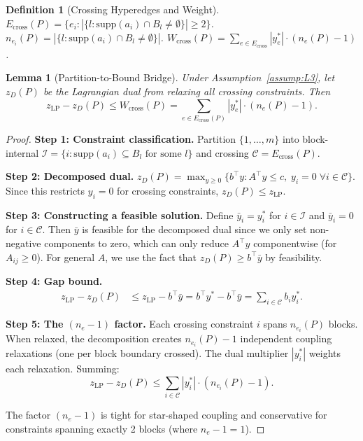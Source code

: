 \documentclass[12pt]{article}
\newtheorem{lemma}[theorem]{Lemma}
\newtheorem{definition}[theorem]{Definition}
\begin{document}
\begin{definition}[Crossing Hyperedges and Weight]
\label{def:crossing}
$E_{\mathrm{cross}}(P) = \{e_i : |\{l : \mathrm{supp}(a_i) \cap B_l \neq \emptyset\}| \geq 2\}$.
$n_{e_i}(P) = |\{l : \mathrm{supp}(a_i) \cap B_l \neq \emptyset\}|$.
$W_{\mathrm{cross}}(P) = \sum_{e \in E_{\mathrm{cross}}} |y_e^*| \cdot (n_e(P) - 1)$.
\end{definition}

\begin{lemma}[Partition-to-Bound Bridge]
\label{lem:L3}
Under Assumption~\ref{assump:L3}, let $z_D(P)$ be the Lagrangian dual
from relaxing all crossing constraints.  Then
\begin{equation}\label{eq:L3}
  z_{\mathrm{LP}} - z_D(P) \leq W_{\mathrm{cross}}(P)
  = \sum_{e \in E_{\mathrm{cross}}(P)} |y_e^*| \cdot (n_e(P) - 1).
\end{equation}
\end{lemma}

\begin{proof}
\textbf{Step 1: Constraint classification.}
Partition $\{1, \ldots, m\}$ into block-internal
$\mathcal{I} = \{i : \mathrm{supp}(a_i) \subseteq B_l \text{ for some } l\}$
and crossing $\mathcal{C} = E_{\mathrm{cross}}(P)$.

\textbf{Step 2: Decomposed dual.}
$z_D(P) = \max_{y \geq 0} \{ b^\top y : A^\top y \leq c,\; y_i = 0\;\forall i \in \mathcal{C} \}$.
Since this restricts $y_i = 0$ for crossing constraints, $z_D(P) \leq z_{\mathrm{LP}}$.

\textbf{Step 3: Constructing a feasible solution.}
Define $\bar{y}_i = y_i^*$ for $i \in \mathcal{I}$ and $\bar{y}_i = 0$ for
$i \in \mathcal{C}$.  Then $\bar{y}$ is feasible for the decomposed dual
since we only set non-negative components to zero, which can only reduce
$A^\top y$ componentwise (for $A_{ij} \geq 0$).  For general $A$, we use
the fact that $z_D(P) \geq b^\top \bar{y}$ by feasibility.

\textbf{Step 4: Gap bound.}
\begin{align}
  z_{\mathrm{LP}} - z_D(P)
  &\leq z_{\mathrm{LP}} - b^\top \bar{y}
  = b^\top y^* - b^\top \bar{y}
  = \sum_{i \in \mathcal{C}} b_i y_i^*.
\end{align}

\textbf{Step 5: The $(n_e - 1)$ factor.}
Each crossing constraint $i$ spans $n_{e_i}(P)$ blocks.  When relaxed, the
decomposition creates $n_{e_i}(P) - 1$ independent coupling relaxations
(one per block boundary crossed).  The dual multiplier $|y_i^*|$
weights each relaxation.  Summing:
\[
  z_{\mathrm{LP}} - z_D(P) \leq \sum_{i \in \mathcal{C}} |y_i^*| \cdot (n_{e_i}(P) - 1).
\]

The factor $(n_e - 1)$ is tight for star-shaped coupling and conservative
for constraints spanning exactly 2 blocks (where $n_e - 1 = 1$).
\end{proof}
\end{document}
